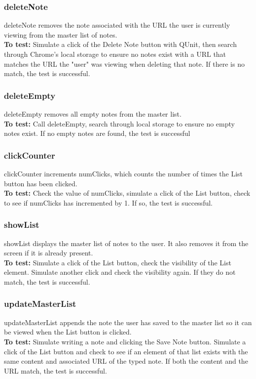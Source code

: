 \documentclass[12pt, titlepage]{article}
\begin{document}
\subsubsection{deleteNote}
	deleteNote removes the note associated with the URL the user is currently 
	viewing from the master list of notes.\\
	\textbf{To test:} Simulate a click of the Delete Note button with QUnit, 
	then search through Chrome's local storage to ensure no notes exist with a 
	URL that matches the URL the "user" was viewing when deleting that note. If 
	there is no match, the test is successful.
\subsubsection{deleteEmpty}
	deleteEmpty removes all empty notes from the master list.\\
	\textbf{To test:} Call deleteEmpty, search through local storage to ensure 
	no empty notes exist. If no empty notes are found, the test is successful
\subsubsection{clickCounter}
	clickCounter increments numClicks, which counts the number of times the 
	List button has been clicked.\\
	\textbf{To test:} Check the value of numClicks, simulate a click of the 
	List button, 
	check to see if numClicks has incremented by 1. If so, the test is 
	successful.
\subsubsection{showList}
	showList displays the master list of notes to the user. It also removes it 
	from the screen if it is already present.\\
	\textbf{To test:} Simulate a click of the List button, check the visibility 
	of the 
	List element. Simulate another click and check the visibility again. If 
	they do not match, the test is successful.
\subsubsection{updateMasterList}
	updateMasterList appends the note the user has saved to the master list so 
	it can be viewed when the List button is clicked.\\
	\textbf{To test:} Simulate writing a note and clicking the Save Note 
	button. 
	Simulate a click of the List button and check to see if an element of that 
	list exists with the same content and associated URL of the typed note. If 
	both the content and the URL match, the test is successful.
\end{document}
